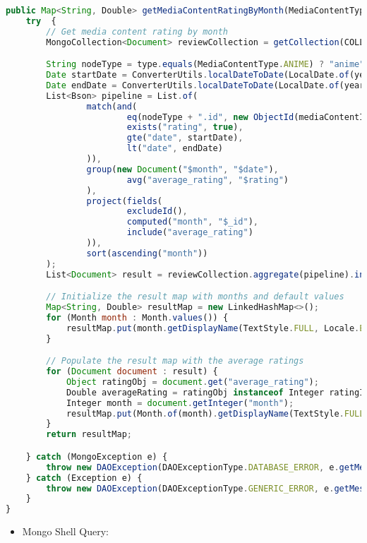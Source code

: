 \begin{lstlisting}[language=JavaScript]
public Map<String, Double> getMediaContentRatingByMonth(MediaContentType type, String mediaContentId, int year) throws DAOException {
    try  {
        // Get media content rating by month
        MongoCollection<Document> reviewCollection = getCollection(COLLECTION_NAME);

        String nodeType = type.equals(MediaContentType.ANIME) ? "anime" : "manga";
        Date startDate = ConverterUtils.localDateToDate(LocalDate.of(year, 1, 1));
        Date endDate = ConverterUtils.localDateToDate(LocalDate.of(year + 1, 1, 1));
        List<Bson> pipeline = List.of(
                match(and(
                        eq(nodeType + ".id", new ObjectId(mediaContentId)),
                        exists("rating", true),
                        gte("date", startDate),
                        lt("date", endDate)
                )),
                group(new Document("$month", "$date"),
                        avg("average_rating", "$rating")
                ),
                project(fields(
                        excludeId(),
                        computed("month", "$_id"),
                        include("average_rating")
                )),
                sort(ascending("month"))
        );
        List<Document> result = reviewCollection.aggregate(pipeline).into(new ArrayList<>());

        // Initialize the result map with months and default values
        Map<String, Double> resultMap = new LinkedHashMap<>();
        for (Month month : Month.values()) {
            resultMap.put(month.getDisplayName(TextStyle.FULL, Locale.ENGLISH), null);
        }

        // Populate the result map with the average ratings
        for (Document document : result) {
            Object ratingObj = document.get("average_rating");
            Double averageRating = ratingObj instanceof Integer ratingInt ? ratingInt.doubleValue() : (Double) ratingObj;
            Integer month = document.getInteger("month");
            resultMap.put(Month.of(month).getDisplayName(TextStyle.FULL, Locale.ENGLISH), averageRating);
        }
        return resultMap;

    } catch (MongoException e) {
        throw new DAOException(DAOExceptionType.DATABASE_ERROR, e.getMessage());
    } catch (Exception e) {
        throw new DAOException(DAOExceptionType.GENERIC_ERROR, e.getMessage());
    }
}
\end{lstlisting}
\begin{itemize}
    \item Mongo Shell Query:
\end{itemize}
